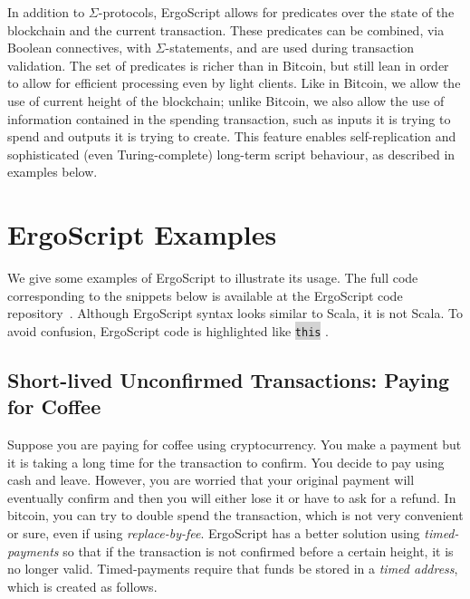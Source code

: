\documentclass[11pt]{article}
\newcommand\Hi[2][lightgray]{%
	\hspace*{-\fboxsep}%
	\colorbox{#1}{#2}%
	\hspace*{-\fboxsep}%
}
\newcommand{\authnote}[2]{\marginpar{\parbox{\marginparwidth}{\tiny %
  \textsf{#1 {\textcolor{blue}{notes: #2}}}}}%
  \textcolor{blue}{\textbf{\dag}}}
\newcommand{\authnote}[2]{
  \textsf{#1 \textcolor{blue}{: #2}}}
\newcommand{\authnote}[2]{}
\newcommand{\lnote}[1]{{\authnote{\textcolor{orange}{Leo notes}}{#1}}}
\newcommand{\snote}[1]{{\authnote{\textcolor{yellow}{Scalahub notes}}{#1}}}
\newcommand{\langname}{ErgoScript\xspace}
\begin{document}
In addition to $\Sigma$-protocols, \langname allows for predicates over the state of the blockchain and the current transaction. These predicates can be combined, via Boolean connectives, with $\Sigma$-statements, and are used during transaction validation. The set of predicates is richer than in Bitcoin, but still lean in order to allow for efficient processing even by light clients. Like in Bitcoin, we allow the use of current height of the blockchain; unlike Bitcoin, we also allow the use of information contained in the spending transaction, such as inputs it is trying to spend and outputs it is trying to create. This feature enables self-replication and sophisticated (even Turing-complete) long-term script behaviour, as described in examples below.





\section{\langname Examples}

We give some examples of \langname to illustrate its usage. The full code corresponding to the snippets below is available at the \langname code repository~\cite{langrepo}. 
Although \langname syntax looks similar to Scala, it is not Scala. To avoid confusion, \langname code is highlighted like \Hi{\texttt{this}}.

\subsection{Short-lived Unconfirmed Transactions: Paying for Coffee}

Suppose you are paying for coffee using cryptocurrency. You make a payment but it is taking a long time for the transaction to confirm. You decide to pay using cash and leave. However, you are worried that your original payment will eventually confirm and then you will either lose it or have to ask for a refund. In bitcoin, you can try to double spend the transaction, which is not very convenient or sure, even if using {\em replace-by-fee}. \langname has a better solution using {\em timed-payments} so that if the transaction is not confirmed before a certain height, it is no longer valid. Timed-payments require that funds be stored in a {\em timed address}, which is created as follows. 
\end{document}
